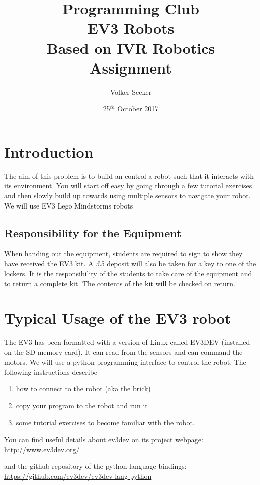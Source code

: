 \documentclass{article}
\title{
    \textbf{Programming Club}\\
    EV3 Robots \\
    {\small Based on IVR Robotics Assignment}
}
\author{Volker Seeker}
\date{25$^{th}$ October 2017}
\begin{document}
    \maketitle

\setlength{\parskip}{1em}
\setlength{\parindent}{0em}

    \section{Introduction}
    The aim of this problem is to build an control a robot such that it interacts
    with its environment. You will start off easy by going through a few tutorial
    exercises and then slowly build up towards using multiple sensors to navigate
    your robot. We will use EV3 Lego Mindstorms robots 

    \subsection{Responsibility for the Equipment}
    When handing out the equipment, students are required to
    sign to show they have received the EV3 kit. A \pounds5 deposit
    will also be taken for a key to one of the lockers. It
    is the responsibility of the students to take care of the
    equipment and to return a complete kit. The contents of the
    kit will be checked on return. 

    \section{Typical Usage of the EV3 robot}

  The EV3 has been formatted with a version of Linux called EV3DEV (installed on the SD  
  memory card). It can read from the sensors and can command the motors. We will use a python  
  programming interface to control the robot. The following instructions describe
  \begin{enumerate}
      \item how to connect to the robot (aka the brick) 
      \item copy your program to the robot and run it 
      \item some tutorial exercises to become familiar with the robot. 
  \end{enumerate}

  You can find useful details about ev3dev on its project webpage: 
  \url{http://www.ev3dev.org/}

  and the github repository of the python language bindings:
  \url{https://github.com/ev3dev/ev3dev-lang-python}
  
\end{document}

